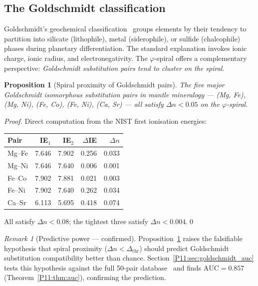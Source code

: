\documentclass[11pt,a4paper]{article}
\newtheorem{proposition}[theorem]{Proposition}
\theoremstyle{definition}
\theoremstyle{remark}
\newtheorem{remark}[theorem]{Remark}
\newcommand{\vp}{\varphi}
\begin{document}
\subsection{The Goldschmidt classification}

Goldschmidt's geochemical classification~\cite{Goldschmidt1937}
groups elements by their tendency to partition into
silicate (lithophile), metal (siderophile), or sulfide (chalcophile)
phases during planetary differentiation.
The standard explanation invokes ionic charge, ionic radius,
and electronegativity.
The $\vp$-spiral offers a complementary perspective:
\emph{Goldschmidt substitution pairs tend to cluster on the spiral}.

\begin{proposition}[Spiral proximity of Goldschmidt pairs]
\label{P11:prop:goldschmidt}
The five major Goldschmidt isomorphous substitution pairs
in mantle mineralogy --- (Mg, Fe), (Mg, Ni), (Fe, Co),
(Fe, Ni), (Ca, Sr) --- all satisfy $\Delta n < 0.05$ on the
$\vp$-spiral.
\end{proposition}

\begin{proof}
Direct computation from the NIST first ionisation energies:
\begin{center}
\begin{tabular}{lrrrr}
\toprule
Pair & IE$_1$ & IE$_2$ & $\Delta$IE & $\Delta n$ \\
\midrule
Mg--Fe & 7.646 & 7.902 & 0.256 & 0.033 \\
Mg--Ni & 7.646 & 7.640 & 0.006 & 0.001 \\
Fe--Co & 7.902 & 7.881 & 0.021 & 0.003 \\
Fe--Ni & 7.902 & 7.640 & 0.262 & 0.034 \\
Ca--Sr & 6.113 & 5.695 & 0.418 & 0.074 \\
\bottomrule
\end{tabular}
\end{center}
All satisfy $\Delta n < 0.08$; the tightest three satisfy
$\Delta n < 0.004$.\qed
\end{proof}

\begin{remark}[Predictive power — confirmed]
\label{P11:rem:predictive_power_confirmed}
Proposition~\ref{P11:prop:goldschmidt} raises the falsifiable hypothesis that
spiral proximity ($\Delta n < \Delta_\mathrm{thr}$) should predict
Goldschmidt substitution compatibility better than chance.
Section~\ref{P11:sec:goldschmidt_auc} tests this hypothesis against the full
50-pair database~\cite{Goldschmidt1937,Burns1967} and finds
$\mathrm{AUC} = 0.857$ (Theorem~\ref{P11:thm:auc}), confirming the prediction.
\end{remark}
\end{document}

